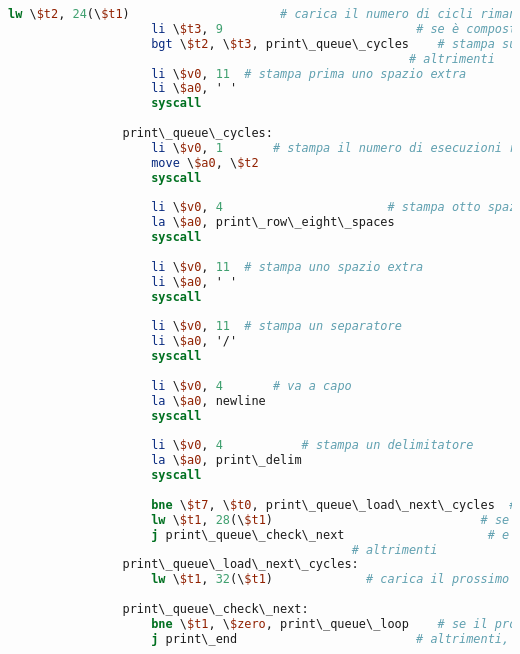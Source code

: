 \begin{center}
\begin{lstlisting}[language=mips, gobble=14, stepnumber=1]
                    lw \$t2, 24(\$t1)                     # carica il numero di cicli rimanenti
                    li \$t3, 9                           # se è composto da due cifre
                    bgt \$t2, \$t3, print\_queue\_cycles    # stampa subito il numero di cicli
                                                        # altrimenti
                    li \$v0, 11  # stampa prima uno spazio extra
                    li \$a0, ' '
                    syscall
                    
                print\_queue\_cycles:
                    li \$v0, 1       # stampa il numero di esecuzioni rimanenti
                    move \$a0, \$t2
                    syscall
                    
                    li \$v0, 4                       # stampa otto spazi
                    la \$a0, print\_row\_eight\_spaces
                    syscall
                    
                    li \$v0, 11  # stampa uno spazio extra
                    li \$a0, ' '
                    syscall
                    
                    li \$v0, 11  # stampa un separatore
                    li \$a0, '/'
                    syscall
                    
                    li \$v0, 4       # va a capo
                    la \$a0, newline
                    syscall
                    
                    li \$v0, 4           # stampa un delimitatore
                    la \$a0, print\_delim
                    syscall
                    
                    bne \$t7, \$t0, print\_queue\_load\_next\_cycles  # controlla la politica di scheduling attuale
                    lw \$t1, 28(\$t1)                             # se è A, carica il prossimo elemento della lista A
                    j print\_queue\_check\_next                    # e salta al controllo del prossimo elemento
                                                # altrimenti
                print\_queue\_load\_next\_cycles:
                    lw \$t1, 32(\$t1)             # carica il prossimo elemento della lista B
                    
                print\_queue\_check\_next:
                    bne \$t1, \$zero, print\_queue\_loop    # se il prossimo elemento non è nullo, esegui un altro ciclo
                    j print\_end                         # altrimenti, salta alla fine della stampa
                    

\end{lstlisting}
\end{center}
